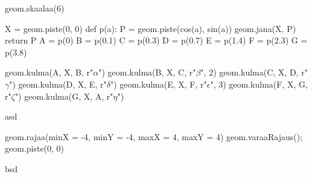 \begin{kuva}
geom.skaalaa(6)

X = geom.piste(0, 0)
def p(a):
	P = geom.piste(cos(a), sin(a))
	geom.jana(X, P)
	return P
A = p(0)
B = p(0.1)
C = p(0.3)
D = p(0.7)
E = p(1.4)
F = p(2.3)
G = p(3.8)

geom.kulma(A, X, B, r"$\alpha$")
geom.kulma(B, X, C, r"$\beta$", 2)
geom.kulma(C, X, D, r"$\gamma$")
geom.kulma(D, X, E, r"$\delta$")
geom.kulma(E, X, F, r"$\epsilon$", 3)
geom.kulma(F, X, G, r"$\zeta$")
geom.kulma(G, X, A, r"$\eta$")
\end{kuva}

asd

\begin{kuva}
geom.rajaa(minX = -4, minY = -4, maxX = 4, maxY = 4)
geom.varaaRajaus();
geom.piste(0, 0)
\end{kuva}

bsd
